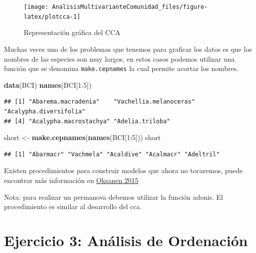 \documentclass[]{book}
\newenvironment{Shaded}{\begin{snugshade}}{\end{snugshade}}
\newcommand{\KeywordTok}[1]{\textcolor[rgb]{0.13,0.29,0.53}{\textbf{{#1}}}}
\newcommand{\DecValTok}[1]{\textcolor[rgb]{0.00,0.00,0.81}{{#1}}}
\newcommand{\StringTok}[1]{\textcolor[rgb]{0.31,0.60,0.02}{{#1}}}
\newcommand{\NormalTok}[1]{{#1}}
\begin{document}
\begin{figure}

{\centering \texttt{[image: AnalisisMultivarianteComunidad\_files/figure-latex/plotcca-1]} 

}

\caption{Representación gráfica del CCA}\label{fig:plotcca}
\end{figure}

Muchas veces uno de los problemas que tenemos para graficar los datos es
que los nombres de las especies son muy largos, en estos casos podemos
utilizar una función que se denomina \texttt{make.cepnames} la cual
permite acortar los nombres.

\begin{Shaded}
\begin{Highlighting}[]
\KeywordTok{data}\NormalTok{(BCI)}
\KeywordTok{names}\NormalTok{(BCI[}\DecValTok{1}\NormalTok{:}\DecValTok{5}\NormalTok{])}
\end{Highlighting}
\end{Shaded}

\begin{verbatim}
## [1] "Abarema.macradenia"    "Vachellia.melanoceras" "Acalypha.diversifolia"
## [4] "Acalypha.macrostachya" "Adelia.triloba"
\end{verbatim}

\begin{Shaded}
\begin{Highlighting}[]
\NormalTok{short <-}\StringTok{ }\KeywordTok{make.cepnames}\NormalTok{(}\KeywordTok{names}\NormalTok{(BCI[}\DecValTok{1}\NormalTok{:}\DecValTok{5}\NormalTok{]))}
\NormalTok{short}
\end{Highlighting}
\end{Shaded}

\begin{verbatim}
## [1] "Abarmacr" "Vachmela" "Acaldive" "Acalmacr" "Adeltril"
\end{verbatim}

Existen procedimientos para construir modelos que ahora no tocaremos,
puede encontrar más información en
\href{http://cc.oulu.fi/~jarioksa/opetus/metodi/vegantutor.pdf}{Oksanen
2015}

Nota: para realizar un permanova debemos utilizar la función adonis. El
procedimiento es similar al desarrollo del cca.

\section{Ejercicio 3: Análisis de
Ordenación}\label{ejercicio-3-analisis-de-ordenacion}
\end{document}
